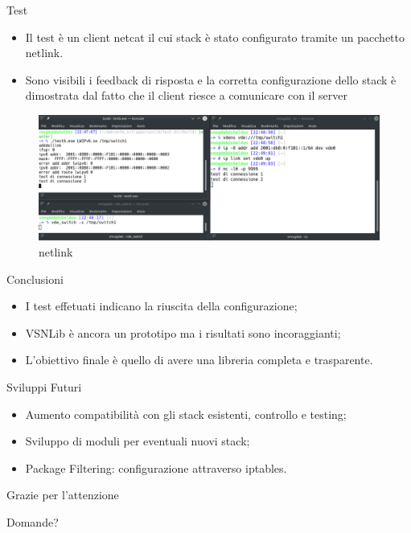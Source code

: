 \documentclass{beamer}
\begin{document}
\begin{frame}[fragile]{Test}
	\begin{itemize}
\item Il test \`e un client netcat il cui stack \`e stato configurato tramite un pacchetto netlink.\\
\item Sono visibili i feedback di risposta e la corretta configurazione dello stack \`e dimostrata dal fatto che il client riesce a comunicare con il server
\end{itemize}
\begin{figure}[t!]
\includegraphics[scale=0.28]{img/test6_b}
\caption{netlink}
\end{figure}
\end{frame}

\begin{frame}[fragile]{Conclusioni}
 \begin{itemize}
     \item I test effetuati indicano la riuscita della configurazione;
     \item VSNLib \`e ancora un prototipo ma i risultati sono incoraggianti;
     \item L'obiettivo finale \`e quello di avere una libreria completa e trasparente.
 \end{itemize}
\end{frame}


\begin{frame}[fragile]{Sviluppi Futuri}
 \begin{itemize}
	 	\item Aumento compatibilit\`a con gli stack esistenti, controllo e testing;
		\item Sviluppo di moduli per eventuali nuovi stack;
     \item Package Filtering: configurazione attraverso iptables.
 \end{itemize}
\end{frame}


\begin{frame}[c]

\begin{center}
\LARGE Grazie per l'attenzione\\
\vspace{1em}

Domande?
\end{center}
\end{frame}
\end{document}
